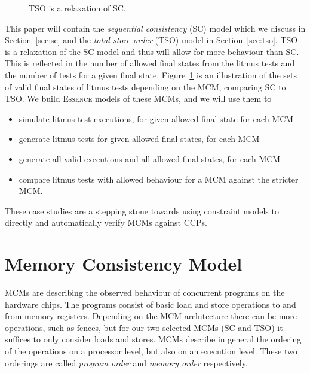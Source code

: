 \documentclass[runningheads]{llncs}
\newcommand{\essence}[0]{\textsc{Essence}}
\begin{document}
\begin{figure}
    \begin{center}
    \caption{TSO is a relaxation of SC.}
    \label{fig:venn}
    \end{center}
\end{figure}


This paper will contain the \emph{sequential consistency} (SC) model which we discuss in Section~\ref{sec:sc} and the \emph{total store order} (TSO) model in Section~\ref{sec:tso}.
TSO is a relaxation of the SC model and thus will allow for more behaviour than SC.
This is reflected in the number of allowed final states from the litmus tests and the number of tests for a given final state.
Figure~\ref{fig:venn} is an illustration of the sets of valid final states of litmus tests depending on the MCM, comparing SC to TSO.
We build \essence{} models of these MCMs, and we will use them to
\begin{itemize}
    \item simulate litmus test executions, for given allowed final state for each MCM
    \item generate litmus tests for given allowed final states, for each MCM
    \item generate all valid executions and all allowed final states, for each MCM
    \item compare litmus tests with allowed behaviour for a MCM against the stricter MCM.
\end{itemize}


These case studies are a stepping stone towards using constraint models to directly and automatically verify MCMs against CCPs.


\section{Memory Consistency Model}
MCMs are describing the observed behaviour of concurrent programs on the hardware chips.
The programs consist of basic load and store operations to and from memory registers.
Depending on the MCM architecture there can be more operations, such as fences, but for our two selected MCMs (SC and TSO) it suffices to only consider loads and stores.
MCMs describe in general the ordering of the operations on a processor level, but also on an execution level.
These two orderings are called \emph{program order} and \emph{memory order} respectively.
\end{document}
